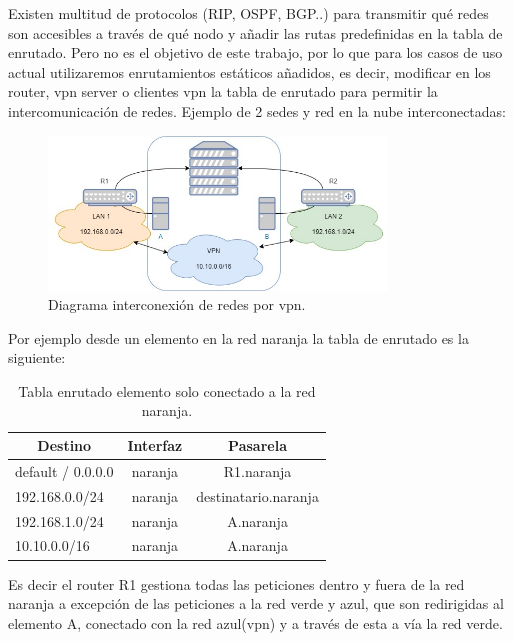 Existen multitud de protocolos (RIP, OSPF, BGP..) para transmitir qué redes son accesibles a través de qué nodo y añadir las rutas predefinidas en la tabla de enrutado. Pero no es el objetivo de este trabajo, por lo que para los casos de uso actual utilizaremos enrutamientos estáticos añadidos, es decir, modificar en los router, vpn server o clientes vpn la tabla de enrutado para permitir la intercomunicación de redes. Ejemplo de 2 sedes y red en la nube interconectadas:
\begin{figure}[!htb]
\begin{center}
\includegraphics[width=0.8\textwidth]{./figuras/interconexion_redes}
\caption{Diagrama interconexión de redes por vpn.}
\label{F:interconexion_redes}
\end{center}
\end{figure}

Por ejemplo desde un elemento en la red naranja la tabla de enrutado es la siguiente:
\begin{table}[htb]
\begin{center}
\label{T:tabla_enrutado__redNaranja}
\caption{Tabla enrutado elemento solo conectado a la red naranja.}
\begin{tabular}{|l|c|c|}
\hline \hline
\multicolumn{1}{|c|}{Destino} & Interfaz   & Pasarela           \\ \hline
default / 0.0.0.0             & naranja    & R1.naranja \\ \hline
192.168.0.0/24                & naranja    & destinatario.naranja      \\ \hline
192.168.1.0/24                & naranja    & A.naranja          \\ \hline
10.10.0.0/16                  & naranja    &  A.naranja        \\ \hline
\end{tabular}
\end{center}
\end{table}
Es decir el router R1 gestiona todas las peticiones dentro y fuera de la red naranja a excepción de las peticiones a la red verde y azul, que son redirigidas al elemento A, conectado con la red azul(vpn) y a través de esta a vía la red verde.

